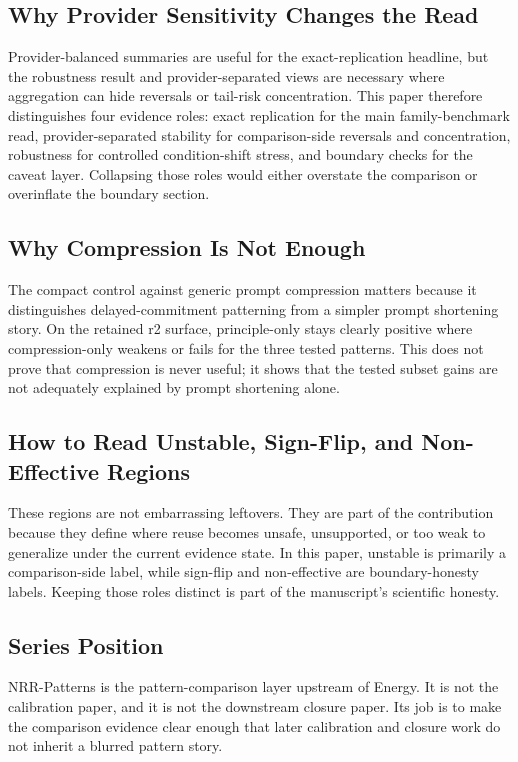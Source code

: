 \documentclass[11pt,a4paper]{article}
\begin{document}
\subsection{Why Provider Sensitivity Changes the Read}

Provider-balanced summaries are useful for the exact-replication headline, but
the robustness result and provider-separated views are necessary where
aggregation can hide reversals or tail-risk concentration. This paper
therefore distinguishes four evidence roles: exact replication for the main
family-benchmark read, provider-separated stability for comparison-side
reversals and concentration, robustness for controlled condition-shift stress,
and boundary checks for the caveat layer. Collapsing those roles would either
overstate the comparison or overinflate the boundary section.

\subsection{Why Compression Is Not Enough}

The compact control against generic prompt compression matters because it distinguishes delayed-commitment patterning from a simpler prompt shortening story. On the retained r2 surface, principle-only stays clearly positive where compression-only weakens or fails for the three tested patterns. This does not prove that compression is never useful; it shows that the tested subset gains are not adequately explained by prompt shortening alone.

\subsection{How to Read Unstable, Sign-Flip, and Non-Effective Regions}

These regions are not embarrassing leftovers. They are part of the contribution because they define where reuse becomes unsafe, unsupported, or too weak to generalize under the current evidence state. In this paper, unstable is primarily a comparison-side label, while sign-flip and non-effective are boundary-honesty labels. Keeping those roles distinct is part of the manuscript's scientific honesty.

\subsection{Series Position}

NRR-Patterns is the pattern-comparison layer upstream of Energy. It is not the
calibration paper, and it is not the downstream closure paper. Its job is to
make the comparison evidence clear enough that later calibration and closure
work do not inherit a blurred pattern story.
\end{document}
